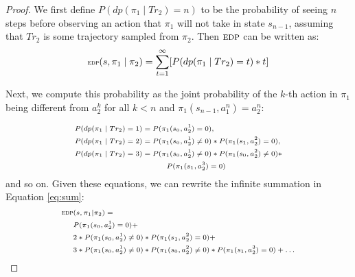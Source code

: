 \documentclass[letterpaper]{article}
\begin{document}
\begin{proof}
We first define $P(dp(\pi_1 \mid Tr_2)=n)$ to be the probability of seeing $n$ steps before observing an action that $\pi_1$ will not take in state $s_{n-1}$, assuming that $Tr_2$ is some trajectory sampled from $\pi_2$. Then $\textsc{edp}$ can be written as:%
\begin{equation}
\scriptsize
\label{eq:sum}
\textsc{edp}(s, \pi_1 \mid \pi_2) = \sum\limits_{t=1}^\infty[P(dp(\pi_1 \mid Tr_2) = t)*t]
\normalsize
\end{equation}

Next, we compute this probability as the joint probability of the $k$-th action in $\pi_1$ being different from $a_2^k$ for all $k < n$ and $\pi_1(s_{n-1},a_1^n)=a_2^n$:

\begin{equation}
\label{eq:series}
\scriptsize
\begin{split}
& P(dp(\pi_1 \mid Tr_2) = 1) = P(\pi_1(s_0, a_2^1) = 0), \\
& P(dp(\pi_1 \mid Tr_2) = 2) = P(\pi_1(s_0, a_2^1) \neq 0)*P(\pi_1(s_1, a_2^2) = 0), \\
& P(dp(\pi_1 \mid Tr_2) = 3) = P(\pi_1(s_0, a_2^1) \neq 0)*P(\pi_1(s_0, a_2^2) \neq 0) * \\ & \qquad \qquad \qquad \qquad \qquad ~~~~~~ P(\pi_1(s_1, a_2^3) = 0)
\end{split}
\normalsize
\end{equation}
and so on. Given these equations, we can rewrite the infinite summation in Equation \ref{eq:sum}:
\begin{equation*}
\scriptsize
\begin{split}
\textsc{edp} & (s, \pi_1 | \pi_2) = \\
& P(\pi_1(s_0, a_2^1) = 0) + \\
& 2*P(\pi_1(s_0, a_2^1) \neq 0)*P(\pi_1(s_1, a_2^2) =0) + \\
& 3*P(\pi_1(s_0, a_2^1) \neq 0)*P(\pi_1(s_0, a_2^2) \neq 0)*P(\pi_1(s_1, a_2^3) = 0) + \ldots
\end{split}
\normalsize
\end{equation*}


\end{proof}
\end{document}
